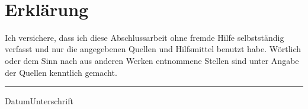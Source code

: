 
\maketitle
~
\newpage


\clearpage

\vspace{10ex}
\section*{Erklärung}
Ich  versichere, dass  ich diese  Abschlussarbeit ohne  fremde  Hilfe selbstständig
verfasst und  nur die  angegebenen Quellen und  Hilfsmittel benutzt  habe. Wörtlich
oder dem  Sinn nach  aus anderen  Werken entnommene Stellen  sind unter  Angabe der
Quellen kenntlich gemacht.
\vspace{10ex}\\

\hrule
\vspace{1ex}
{\small{Datum}}\hfill{\small{Unterschrift}}


\tableofcontents
\newpage

\printnoidxglossary[type=\acronymtype, nogroupskip]
\newpage



\listoffigures
{}
\newpage


\listoftables
{}
\newpage

\renewcommand{\lstlistingname}{Code snippets}
\renewcommand{\lstlistlistingname}{List of Code}
\lstlistoflistings
{}
\newpage



